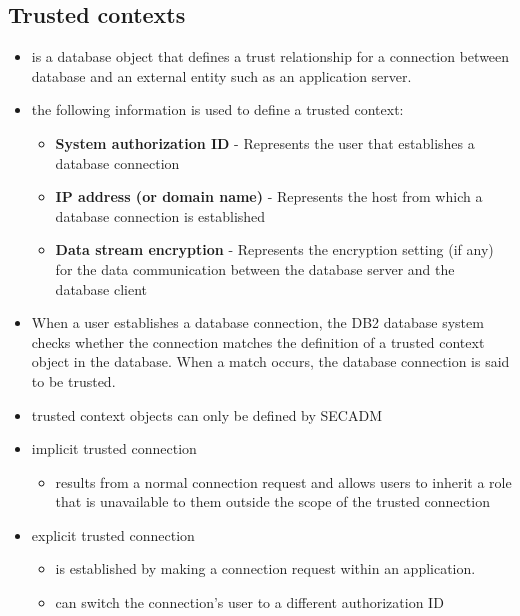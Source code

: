 \documentclass{article}
\begin{document}
\subsection{Trusted contexts}
\begin{itemize}
\item is a database object that defines a trust relationship for a connection between database
and an external entity such as an application server.
\item the following information is used to define a trusted context:
	\begin{itemize}
	\item \textbf{System authorization ID} - Represents the user that establishes a database connection
	\item \textbf{IP address (or domain name)} - Represents the host from which a database connection is
	established
	\item \textbf{Data stream encryption} - Represents the encryption setting (if any) for the data
	communication between the database server and the database client
	\end{itemize}
\item When a user establishes a database connection, the DB2 database system checks whether the connection
matches the definition of a trusted context object in the database. When a match occurs, the database
connection is said to be trusted.
\item trusted context objects can only be defined by SECADM
\item implicit trusted connection
	\begin{itemize}
	\item results from a normal connection request and allows users to inherit a role that is unavailable
	to them outside the scope of the trusted connection
	\end{itemize}
\item explicit trusted connection
	\begin{itemize}
	\item is established by making a connection request within an application.
	\item can switch the connection's user to a different authorization ID
	\end{itemize}
\end{itemize}
\end{document}
